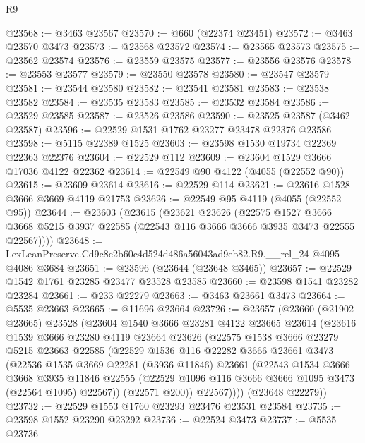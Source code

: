 \begin{lexlean}{R9}
\begin{coremodule}
@23568 := @3463 @23567
@23570 := @660 (@22374 @23451)
@23572 := @3463 @23570 @3473
@23573 := @23568 @23572
@23574 := @23565 @23573
@23575 := @23562 @23574
@23576 := @23559 @23575
@23577 := @23556 @23576
@23578 := @23553 @23577
@23579 := @23550 @23578
@23580 := @23547 @23579
@23581 := @23544 @23580
@23582 := @23541 @23581
@23583 := @23538 @23582
@23584 := @23535 @23583
@23585 := @23532 @23584
@23586 := @23529 @23585
@23587 := @23526 @23586
@23590 := @23525 @23587 (@3462 @23587)
@23596 := @22529 @1531 @1762 @23277 @23478 @22376 @23586
@23598 := @5115 @22389 @1525
@23603 := @23598 @1530 @19734 @22369 @22363 @22376
@23604 := @22529 @112
@23609 := @23604 @1529 @3666 @17036 @4122 @22362
@23614 := @22549 @90 @4122 (@4055 (@22552 @90))
@23615 := @23609 @23614
@23616 := @22529 @114
@23621 := @23616 @1528 @3666 @3669 @4119 @21753
@23626 := @22549 @95 @4119 (@4055 (@22552 @95))
@23644 := @23603
    (@23615
      (@23621
        @23626
        (@22575
          @1527
          @3666
          @3668
          @5215
          @3937
          @22585
          (@22543 @116 @3666 @3666 @3935 @3473 @22555 @22567))))
@23648 := LexLeanPreserve.Cd9c8c2b60c4d524d486a56043ad9eb82.R9.__rel_24 @4095 @4086 @3684
@23651 := @23596 (@23644 (@23648 @3465))
@23657 := @22529 @1542 @1761 @23285 @23477 @23528 @23585
@23660 := @23598 @1541 @23282 @23284
@23661 := @233 @22279
@23663 := @3463 @23661 @3473
@23664 := @5535 @23663
@23665 := @11696 @23664
@23726 := @23657
    (@23660
      (@21902 @23665)
      @23528
      (@23604
        @1540
        @3666
        @23281
        @4122
        @23665
        @23614
        (@23616
          @1539
          @3666
          @23280
          @4119
          @23664
          @23626
          (@22575
            @1538
            @3666
            @23279
            @5215
            @23663
            @22585
            (@22529
              @1536
              @116
              @22282
              @3666
              @23661
              @3473
              (@22536
                @1535
                @3669
                @22281
                (@3936 @11846)
                @23661
                (@22543
                  @1534
                  @3666
                  @3668
                  @3935
                  @11846
                  @22555
                  (@22529 @1096 @116 @3666 @3666 @1095 @3473 (@22564 @1095) @22567))
                (@22571 @200))
              @22567))))
      (@23648 @22279))
@23732 := @22529 @1553 @1760 @23293 @23476 @23531 @23584
@23735 := @23598 @1552 @23290 @23292
@23736 := @22524 @3473
@23737 := @5535 @23736

\end{coremodule}
\end{lexlean}
